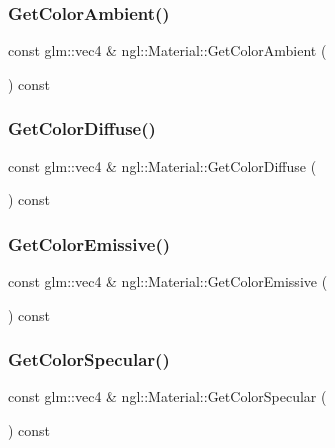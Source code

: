 \subsubsection{\texorpdfstring{Get\+Color\+Ambient()}{GetColorAmbient()}}
{\footnotesize\ttfamily const glm\+::vec4 \& ngl\+::\+Material\+::\+Get\+Color\+Ambient (\begin{DoxyParamCaption}{ }\end{DoxyParamCaption}) const}

\mbox{\label{classngl_1_1_material_a816843cb74cd2cfd3d08f9c6c8640818}} 
\subsubsection{\texorpdfstring{Get\+Color\+Diffuse()}{GetColorDiffuse()}}
{\footnotesize\ttfamily const glm\+::vec4 \& ngl\+::\+Material\+::\+Get\+Color\+Diffuse (\begin{DoxyParamCaption}{ }\end{DoxyParamCaption}) const}

\mbox{\label{classngl_1_1_material_aa2ab47664318d52d179ba2cdbbe19bfe}} 
\subsubsection{\texorpdfstring{Get\+Color\+Emissive()}{GetColorEmissive()}}
{\footnotesize\ttfamily const glm\+::vec4 \& ngl\+::\+Material\+::\+Get\+Color\+Emissive (\begin{DoxyParamCaption}{ }\end{DoxyParamCaption}) const}

\mbox{\label{classngl_1_1_material_aeebd1ebcfd6254bb9a71dd4fb561a94b}} 
\subsubsection{\texorpdfstring{Get\+Color\+Specular()}{GetColorSpecular()}}
{\footnotesize\ttfamily const glm\+::vec4 \& ngl\+::\+Material\+::\+Get\+Color\+Specular (\begin{DoxyParamCaption}{ }\end{DoxyParamCaption}) const}

